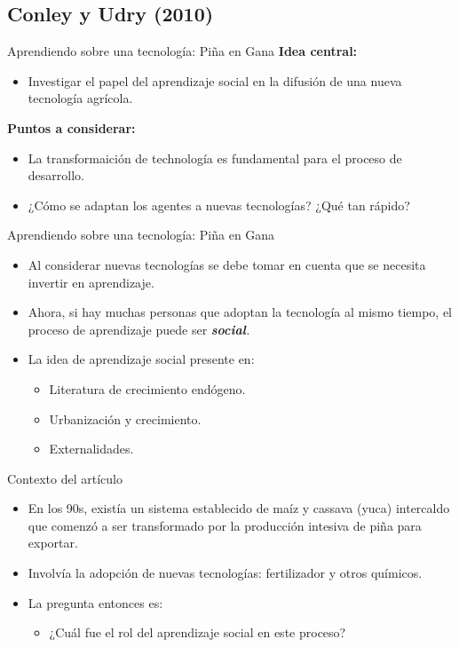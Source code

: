 \documentclass[11pt, aspectratio=169, compress]{beamer}
\begin{document}
\subsection{Conley y Udry (2010)}
\begin{frame}{Aprendiendo sobre una tecnología: Piña en Gana}
\textbf{Idea central:}
\begin{itemize}
	\item Investigar el papel del aprendizaje social en la difusión de una nueva tecnología agrícola. 
\end{itemize}
\textbf{Puntos a considerar:}
\begin{itemize}
	\item La transformaición de technología es fundamental para el proceso de desarrollo. 
	\item ¿Cómo se adaptan los agentes a nuevas tecnologías? ¿Qué tan rápido? 
\end{itemize}
\end{frame}
\begin{frame}{Aprendiendo sobre una tecnología: Piña en Gana}
\begin{itemize}
	\item Al considerar nuevas tecnologías se debe tomar en cuenta que se necesita invertir en aprendizaje. 
	\item Ahora, si hay muchas personas que adoptan la tecnología al mismo tiempo, el proceso de aprendizaje puede ser \textit{\textbf{social}.}
	\item La idea de aprendizaje social presente en: 
	\begin{itemize}
		\item Literatura de crecimiento endógeno.  
		\item Urbanización y crecimiento. 
		\item Externalidades. 
	\end{itemize}
\end{itemize}
\end{frame}
\begin{frame}{Contexto del artículo}
\begin{itemize}
	\item En los 90s, existía un sistema establecido de maíz y cassava (yuca) intercaldo que comenzó a ser transformado por la producción intesiva de piña para exportar. 
	\item Involvía la adopción de nuevas tecnologías: fertilizador y otros químicos. 
	\item La pregunta entonces es: 
	\begin{itemize}
		\item ¿Cuál fue el rol del aprendizaje social en este proceso? 
	\end{itemize}
\end{itemize}	
\end{frame}
\end{document}

